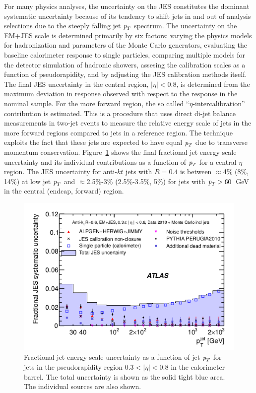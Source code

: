 For many physics analyses, the uncertainty on the JES constitutes the dominant systematic uncertainty because of its tendency to shift jets in and out of analysis selections due to the steeply falling jet ${\emph{p}_{T}}$ spectrum. The uncertainty on the EM+JES scale  is determined primarily by six factors:  varying the physics models for hadronization and parameters of the Monte Carlo generators, evaluating the baseline calorimeter response to single particles, comparing multiple models for the detector simulation of hadronic showers, assesing the calibration scales as a function of pseudorapidity, and by adjusting the JES calibration methods itself.  The final JES uncertainty in the central region, $|\eta| < 0.8$, is determined from the maximum deviation in response observed with respect to the response in the nominal sample.  For the more forward region, the so called ``$\eta$-intercalibration'' contribution is estimated. This is a procedure that uses direct di-jet balance measurements in two-jet events to measure the relative energy scale of jets in the more forward regions compared to jets in a reference region. The technique exploits the fact that these jets are expected to have equal ${\emph{p}_{T}}$ due to transverse momentum conservation. Figure~\ref{fig:JESuncertainty}  shows the final fractional jet energy scale uncertainty and its individual contributions as a function of ${\emph{p}_{T}}$ for a central $\eta$ region. The JES uncertainty for anti-$kt$ jets with $R = 0.4$ is between $\approx$4\% (8\%, 14\%) at low jet ${\emph{p}_{T}}$ and $\approx$2.5\%-3\% (2.5\%-3.5\%, 5\%) for jets with ${\emph{p}_{T}} > 60$~GeV in the central (endcap, forward) region.

\begin{figure}[htbp]
  \begin{center}
      \includegraphics[width=1\textwidth]{JESUncertainty.png}
    \caption{Fractional jet energy scale uncertainty as a function of jet ${\emph{p}_{T}}$ for jets in the pseudorapidity region 0.3$ < |\eta| < $0.8 in the calorimeter barrel. The total uncertainty is shown as the solid tight blue area. The individual sources are also shown.}
    \label{fig:JESuncertainty}
  \end{center}
\end{figure}

